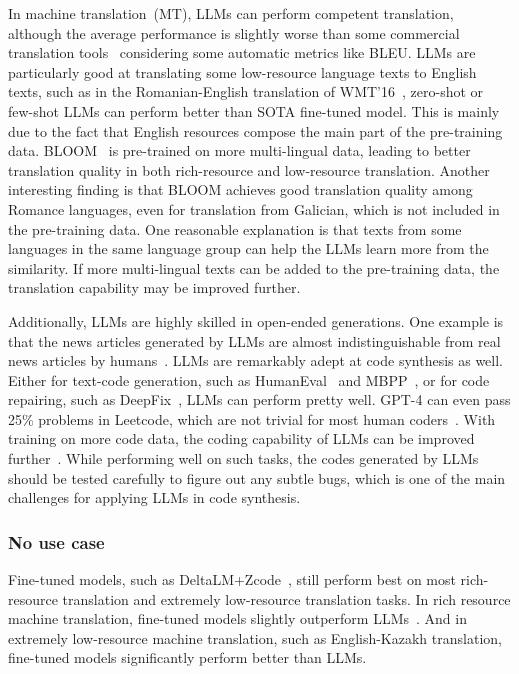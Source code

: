 \documentclass[manuscript,screen, nonacm]{acmart}
\begin{document}
In machine translation~(MT), LLMs can perform competent translation, although the average performance is slightly worse than some commercial translation tools~\cite{jiaochatgpt} considering some automatic metrics like BLEU\cite{papineni2002bleu}. LLMs are particularly good at translating some low-resource language texts to English texts, such as in the Romanian-English translation of WMT'16~\cite{bojar-etal-2016-findings}, zero-shot or few-shot LLMs can perform better than SOTA fine-tuned model\cite{chowdhery2022palm}. This is mainly due to the fact that English resources compose the main part of the pre-training data. BLOOM~\cite{scao2022bloom} is pre-trained on more multi-lingual data, leading to better translation quality in both rich-resource and low-resource translation. Another interesting finding is that BLOOM achieves good translation quality among Romance languages, even for translation from Galician, which is not included in the pre-training data. One reasonable explanation is that texts from some languages in the same language group can help the LLMs learn more from the similarity. 
If more multi-lingual texts can be added to the pre-training data, the translation capability may be improved further. 

 
 Additionally, LLMs are highly skilled in open-ended generations. One example is that the news articles generated by LLMs are almost indistinguishable from real news articles by humans~\cite{brown2020language}.
 LLMs are remarkably adept at code synthesis as well. Either for text-code generation, such as HumanEval~\cite{chen2021evaluating} and MBPP~\cite{austin2021program}, or for code repairing, such as DeepFix~\cite{gupta2017deepfix}, LLMs can perform pretty well. GPT-4 can even pass 25\% problems in Leetcode, which are not trivial for most human coders~\cite{openai2023gpt4}. With training on more code data, the coding capability of LLMs can be improved further~\cite{chowdhery2022palm}. While performing well on such tasks, the codes generated by LLMs should be tested carefully to figure out any subtle bugs, which is one of the main challenges for applying LLMs in code synthesis.



\subsubsection{No use case} 
Fine-tuned models, such as DeltaLM+Zcode~\cite{yang-etal-2021-multilingual-machine}, still perform best on most rich-resource translation and extremely low-resource translation tasks. In rich resource machine translation, fine-tuned models slightly outperform LLMs~\cite{chowdhery2022palm, scao2022bloom}. And in extremely low-resource machine translation, such as English-Kazakh translation, fine-tuned models significantly perform better than LLMs. 
\end{document}

